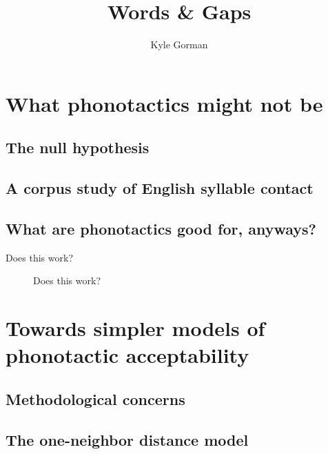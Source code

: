 \documentclass{upenndiss}
\title{Words \& Gaps}
\author{Kyle Gorman}
\begin{document}
\frenchspacing

\FrontMatter

% 

\chapter{What phonotactics might not be}
\lipsum

\section{The null hypothesis}
\section{A corpus study of English syllable contact}
\section{What are phonotactics good for, anyways?}

\begin{table}
\caption{Does this work?}
\end{table}

\begin{figure}
\caption{Does this work?}
\end{figure}


\chapter{Towards simpler models of phonotactic acceptability}
\lipsum

\section{Methodological concerns}

\section{The one-neighbor distance model}
\end{document}
